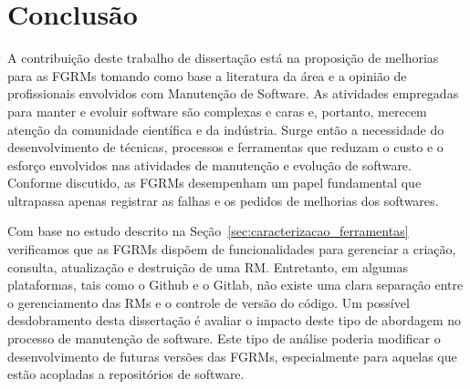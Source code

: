 \chapter{Conclusão}
\label{ch:conclusao_trab_futuros}

A contribuição deste trabalho de dissertação está na proposição de melhorias
para as FGRMs tomando como base a literatura da área e a opinião de
profissionais envolvidos com Manutenção de Software. As atividades empregadas
para manter e evoluir software são complexas e caras e, portanto, merecem
atenção da comunidade científica e da indústria. Surge então a necessidade do
desenvolvimento de técnicas, processos e ferramentas que reduzam o custo e o
esforço envolvidos nas atividades de manutenção e evolução de software.
Conforme discutido, as FGRMs desempenham um papel fundamental que ultrapassa
apenas registrar as falhas e os pedidos de melhorias dos softwares.

Com base no estudo descrito na Seção~\ref{sec:caracterizacao_ferramentas}
verificamos que as FGRMs dispõem de funcionalidades para gerenciar a criação,
consulta, atualização e destruição de uma RM\@. Entretanto, em algumas
plataformas, tais como o Github e o Gitlab, não existe uma clara separação
entre o gerenciamento das RMs e o controle de versão do código. Um possível
desdobramento desta dissertação é avaliar o impacto deste tipo de abordagem no
processo de manutenção de software. Este tipo de análise poderia modificar o
desenvolvimento de futuras versões das FGRMs, especialmente para aquelas que
estão acopladas a repositórios de software.

